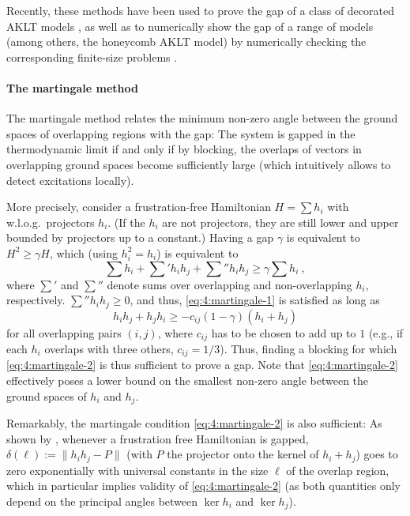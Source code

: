 \documentclass[rmp,aps,reprint,superscriptaddress,nobalancelastpage]{revtex4-1}
\begin{document}
Recently, these methods have been used to prove the gap of a class of decorated AKLT models \cite{abdul2019class}, as well as to numerically show the gap of a range of models (among others, the honeycomb AKLT model) by numerically checking the corresponding finite-size problems \cite{lemm2019existence,pomata2019demonstrating}.



\paragraph{The martingale method}

The martingale method \cite{fannes:FCS,nachtergaele:degen-mps,kastoryano:martingale} relates the minimum non-zero angle between the ground spaces of overlapping regions with the gap: The system is gapped in the thermodynamic limit if and only if by blocking, the overlaps of vectors in overlapping ground spaces become sufficiently large (which intuitively allows to detect excitations locally).

More precisely, consider a frustration-free Hamiltonian $H=\sum h_i$ with w.l.o.g.\ projectors $h_i$. (If the $h_i$ are not projectors, they are still lower and upper bounded by projectors up to a constant.) Having a gap $\gamma$ is equivalent to $H^2 \ge \gamma H$, which (using $h_i^2=h_i$) is equivalent to
\begin{equation}
    \label{eq:4:martingale-1}
    \sum h_i + \sum\nolimits' h_i h_j + \sum\nolimits'' h_ih_j \ge \gamma \sum h_i\ ,
\end{equation}
where $\sum'$ and $\sum''$ denote sums over overlapping and non-overlapping $h_i$, respectively.  $\sum''h_ih_j\ge0$, and thus, \eqref{eq:4:martingale-1} is satisfied as long as
\begin{equation}
    \label{eq:4:martingale-2}
    h_ih_j+h_jh_i \ge -c_{ij} (1-\gamma)(h_i+h_j)
\end{equation}
for all overlapping pairs $(i,j)$, where $c_{ij}$ has to be chosen to add up to $1$ (e.g., if each $h_i$ overlaps with three others, $c_{ij}=1/3$).  Thus, finding a blocking for which \eqref{eq:4:martingale-2} is thus sufficient to prove a gap. Note that \eqref{eq:4:martingale-2} effectively poses a lower bound on the smallest non-zero angle between the ground spaces of $h_i$ and $h_j$.

Remarkably, the martingale condition \eqref{eq:4:martingale-2} is also sufficient: As shown by \textcite{kastoryano:martingale}, whenever a frustration free Hamiltonian is gapped, $\delta(\ell):=\|h_ih_j-P\|$ (with $P$ the projector onto the kernel of $h_i+h_j$) goes to zero exponentially with universal constants in the size $\ell$ of the overlap region, which in particular implies validity of \eqref{eq:4:martingale-2} (as both quantities only depend on the principal angles between $\ker h_i$ and $\ker h_j$).
\end{document}
